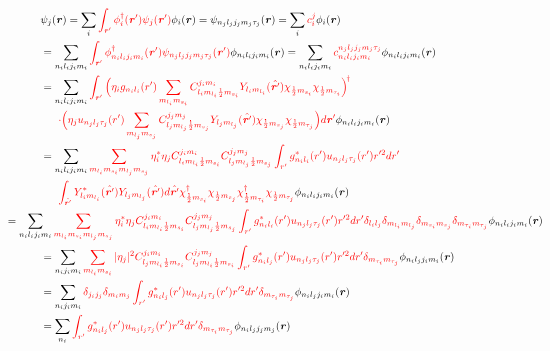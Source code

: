 \documentclass[master]{shnuthesis}
\newcommand{\bmr}{\textbf{\textit{r}}}
\newcommand{\ii}{\!\!\!\!\!\!\!\!\!\!\!\!\!\!\!\!\!\!\!\!}
\newcommand{\ol}{\,\,\,\,\,\,\,\,\,\,}
\begin{document}
\begin{align}
    & \psi_j(\bmr) = \sum_{i} {\color{red} \int_{\bmr^\prime} \phi_i^\dagger(\bmr^{\prime}) \psi_j(\bmr^{\prime})} \phi_i(\bmr) = \psi_{n_j l_j j_j m_j \tau_j}(\bmr) = \sum_{i} {\color{red} c_i^j} \phi_i(\bmr) \\
    &= \sum_{n_i l_i j_i m_i} {\color{red} \int_{\bmr^\prime} \phi_{n_i l_i j_i m_i}^\dagger(\bmr^{\prime}) \psi_{n_j l_j j_j m_j \tau_j}(\bmr^{\prime})} \phi_{n_i l_i j_i m_i}(\bmr) = \sum_{n_i l_i j_i m_i} {\color{red} c_{n_i l_i j_i m_i}^{n_j l_j j_j m_j \tau_j}} \phi_{n_i l_i j_i m_i}(\bmr) \\
    &= \sum_{n_i l_i j_i m_i} {\color{red} \int_{\bmr^\prime} \Big( \eta_i g_{n_i l_i}(r^\prime)\sum_{m_{l_i}m_{s_i}}C_{l_i m_{l_i} \frac{1}{2} m_{s_i}}^{j_i m_i} Y_{l_i m_{l_i}}(\hat{\bmr^\prime}) \chi_{\frac{1}{2} m_{s_i}} \chi_{\frac{1}{2} m_{\tau_i}} \Big)^{\!\dagger}} \notag\\
    &\ol {\color{red}\cdot\Big( \eta_j u_{n_j l_j \tau_j}(r^\prime)\sum_{m_{l_j}m_{s_j}}C_{l_j m_{l_j} \frac{1}{2} m_{s_j}}^{j_j m_j} Y_{l_j m_{l_j}}(\hat{\bmr^\prime}) \chi_{\frac{1}{2} m_{s_j}} \chi_{\frac{1}{2} m_{\tau_j}} \Big)d\bmr^\prime} \phi_{n_i l_i j_i m_i}(\bmr) \\
    &= \sum_{n_i l_i j_i m_i} {\color{red} \sum_{m_{l_i}m_{s_i}m_{l_j}m_{s_j}} \eta_i^\ast \eta_j C_{l_i m_{l_i} \frac{1}{2} m_{s_i}}^{j_i m_i} C_{l_j m_{l_j} \frac{1}{2} m_{s_j}}^{j_j m_j} \int_{r^\prime} g^\ast_{n_i l_i}(r^\prime)u_{n_j l_j \tau_j}(r^\prime)r^{\prime 2} dr^\prime} \notag\\
    &\ol {\color{red}\int_{\hat{{\bmr}^\prime}}Y^\ast_{l_i m_{l_i}}(\hat{\bmr^\prime}) Y_{l_j m_{l_j}}(\hat{\bmr^\prime})d\hat{\bmr^\prime} \chi^\dagger_{\frac{1}{2} m_{s_i}} \chi_{\frac{1}{2} m_{s_j}} \chi^\dagger_{\frac{1}{2} m_{\tau_i}} \chi_{\frac{1}{2} m_{\tau_j}} } \phi_{n_i l_i j_i m_i}(\bmr) \\
    &\ii= \sum_{n_i l_i j_i m_i} {\color{red} \sum_{m_{l_i}m_{s_i}m_{l_j}m_{s_j}}\eta_i^\ast \eta_j C_{l_i m_{l_i} \frac{1}{2} m_{s_i}}^{j_i m_i} C_{l_j m_{l_j} \frac{1}{2} m_{s_j}}^{j_j m_j} \int_{r^\prime} g^\ast_{n_i l_i}(r^\prime)u_{n_j l_j \tau_j}(r^\prime)r^{\prime 2} dr^\prime \delta_{l_i l_j}\delta_{m_{l_i}m_{l_j}} \delta_{m_{s_i} m_{s_j}}\delta_{m_{\tau_i} m_{\tau_j}} } \phi_{n_i l_i j_i m_i}(\bmr) \\
    &= \sum_{n_i j_i m_i} {\color{red} \sum_{m_{l_i}m_{s_i}} |\eta_j|^2  C_{l_j m_{l_i} \frac{1}{2} m_{s_i}}^{j_i m_i} C_{l_j m_{l_i} \frac{1}{2} m_{s_i}}^{j_j m_j} \int_{r^\prime} g^\ast_{n_i l_j}(r^\prime)u_{n_j l_j \tau_j}(r^\prime)r^{\prime 2} dr^\prime \delta_{m_{\tau_i} m_{\tau_j}}} \phi_{n_i l_j j_i m_i}(\bmr) \\
    &= \sum_{n_i j_i m_i} {\color{red} \delta_{j_i j_j}\delta_{m_i m_j} \int_{r^\prime} g^\ast_{n_i l_j}(r^\prime)u_{n_j l_j \tau_j}(r^\prime)r^{\prime 2} dr^\prime \delta_{m_{\tau_i} m_{\tau_j}}} \phi_{n_i l_j j_i m_i}(\bmr) \\
    &= \sum_{n_i} {\color{red} \int_{r^\prime} g^\ast_{n_i l_j}(r^\prime)u_{n_j l_j \tau_j}(r^\prime)r^{\prime 2} dr^\prime \delta_{m_{\tau_i} m_{\tau_j}}} \phi_{n_i l_j j_j m_j}(\bmr)
\end{align}
\end{document}
